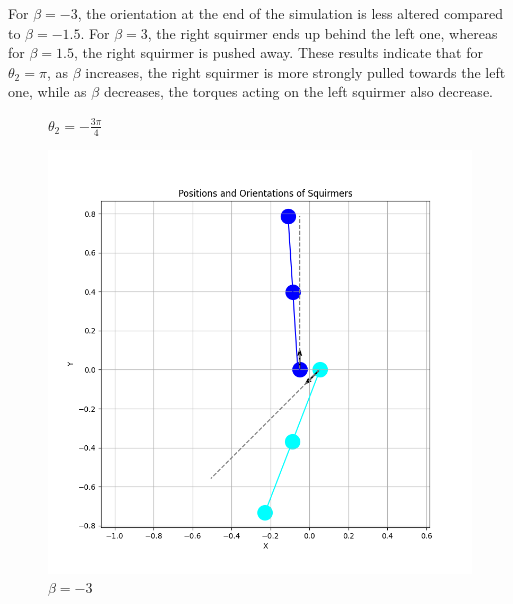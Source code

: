 \documentclass{article}
\begin{document}
For $\beta = -3$, the orientation at the end of the simulation is less altered compared to $\beta = -1.5$.
For $\beta = 3$, the right squirmer ends up behind the left one, whereas for $\beta = 1.5$, the right
squirmer is pushed away.
These results indicate that for $\theta_2 = \pi$, as $\beta$ increases, the right squirmer is more strongly pulled 
towards the left one, while as $\beta$ decreases, the torques acting on the left squirmer also decrease.

\begin{figure}[H]
    \centering
    \textbf{$\theta_2 = -\frac{3\pi}{4}$}\par\medskip
    \begin{minipage}{0.49\textwidth}
        \includegraphics[width=1.1\textwidth]{graphs/simulations/sim_sq_sq/betam3/m3pi_4_.png}
        \caption{\footnotesize $\beta = -3$}
    \end{minipage}\hfill
    \begin{minipage}{0.49\textwidth}

\end{minipage}
\end{figure}
\end{document}
